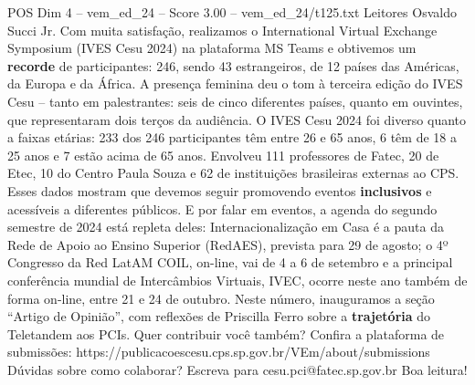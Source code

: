 \begin{textsample}{POS Dim 4 – vem\_ed\_24 – Score 3.00 – vem\_ed\_24/t125.txt}  \label{ex:f4_pos_103}
Leitores Osvaldo Succi Jr.
Com muita satisfação, realizamos o International Virtual Exchange Symposium (IVES Cesu 2024) na plataforma MS Teams e obtivemos um \textbf{recorde} de participantes: 246, sendo 43 estrangeiros, de 12 países das Américas, da Europa e da África.
A presença feminina deu o tom à terceira edição do IVES Cesu – tanto em palestrantes: seis de cinco diferentes países, quanto em ouvintes, que representaram dois terços da audiência.
O IVES Cesu 2024 foi diverso quanto a faixas etárias: 233 dos 246 participantes têm entre 26 e 65 anos, 6 têm de 18 a 25 anos e 7 estão acima de 65 anos.
Envolveu 111 professores de Fatec, 20 de Etec, 10 do Centro Paula Souza e 62 de instituições brasileiras externas ao CPS.
Esses dados mostram que devemos seguir promovendo eventos \textbf{inclusivos} e acessíveis a diferentes públicos.
E por falar em eventos, a agenda do segundo semestre de 2024 está repleta deles: Internacionalização em Casa é a pauta da Rede de Apoio ao Ensino Superior (RedAES), prevista para 29 de agosto; o 4º Congresso da Red LatAM COIL, on-line, vai de 4 a 6 de setembro e a principal conferência mundial de Intercâmbios Virtuais, IVEC, ocorre neste ano também de forma on-line, entre 21 e 24 de outubro.
Neste número, inauguramos a seção “Artigo de Opinião”, com reflexões de Priscilla Ferro sobre a \textbf{trajetória} do Teletandem aos PCIs.
Quer contribuir você também?
Confira a plataforma de submissões: https://publicacoescesu.cps.sp.gov.br/VEm/about/submissions Dúvidas sobre como colaborar?
Escreva para cesu.pci@fatec.sp.gov.br Boa leitura!

\end{textsample}
